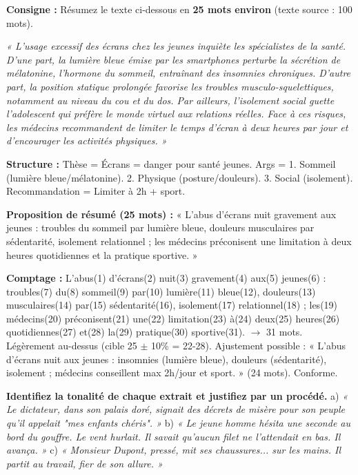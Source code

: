 \documentclass[11pt]{article}
\begin{document}
\begin{exercice}
\textbf{Consigne :} Résumez le texte ci-dessous en \textbf{25 mots environ} (texte source : 100 mots).

\emph{« L'usage excessif des écrans chez les jeunes inquiète les spécialistes de la santé. D'une part, la lumière bleue émise par les smartphones perturbe la sécrétion de mélatonine, l'hormone du sommeil, entraînant des insomnies chroniques. D'autre part, la position statique prolongée favorise les troubles musculo-squelettiques, notamment au niveau du cou et du dos. Par ailleurs, l'isolement social guette l'adolescent qui préfère le monde virtuel aux relations réelles. Face à ces risques, les médecins recommandent de limiter le temps d'écran à deux heures par jour et d'encourager les activités physiques. »}
\end{exercice}

\begin{corrige}[Exercice 2]
\textbf{Structure :} Thèse = Écrans = danger pour santé jeunes. Args = 1. Sommeil (lumière bleue/mélatonine). 2. Physique (posture/douleurs). 3. Social (isolement). Recommandation = Limiter à 2h + sport.

\textbf{Proposition de résumé (25 mots) :}
« L'abus d'écrans nuit gravement aux jeunes : troubles du sommeil par lumière bleue, douleurs musculaires par sédentarité, isolement relationnel ; les médecins préconisent une limitation à deux heures quotidiennes et la pratique sportive. »

\textbf{Comptage :} L'abus(1) d'écrans(2) nuit(3) gravement(4) aux(5) jeunes(6) : troubles(7) du(8) sommeil(9) par(10) lumière(11) bleue(12), douleurs(13) musculaires(14) par(15) sédentarité(16), isolement(17) relationnel(18) ; les(19) médecins(20) préconisent(21) une(22) limitation(23) à(24) deux(25) heures(26) quotidiennes(27) et(28) la(29) pratique(30) sportive(31). $\rightarrow$ 31 mots. Légèrement au-dessus (cible 25 $\pm$ 10\% = 22-28). Ajustement possible : « L'abus d'écrans nuit aux jeunes : insomnies (lumière bleue), douleurs (sédentarité), isolement ; médecins conseillent max 2h/jour et sport. » (24 mots). Conforme.
\end{corrige}

\begin{exercice}
\textbf{Identifiez la tonalité de chaque extrait et justifiez par un procédé.}
a) \emph{« Le dictateur, dans son palais doré, signait des décrets de misère pour son peuple qu'il appelait "mes enfants chéris". »}
b) \emph{« Le jeune homme hésita une seconde au bord du gouffre. Le vent hurlait. Il savait qu'aucun filet ne l'attendait en bas. Il avança. »}
c) \emph{« Monsieur Dupont, pressé, mit ses chaussures... sur les mains. Il partit au travail, fier de son allure. »}
\end{exercice}
\end{document}

